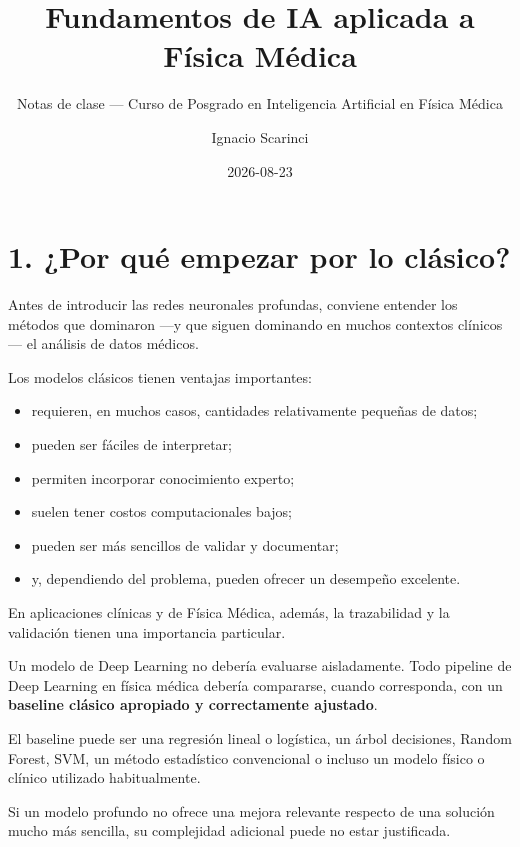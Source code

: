 \documentclass[
  letterpaper,
  DIV=11,
  numbers=noendperiod]{scrartcl}
\title{Fundamentos de IA aplicada a Física Médica}
\subtitle{Notas de clase --- Curso de Posgrado en Inteligencia
Artificial en Física Médica}
\author{Ignacio Scarinci}
\date{2026-08-23}
\providecommand{\tightlist}{%
  \setlength{\itemsep}{0pt}\setlength{\parskip}{0pt}}
\begin{document}
\maketitle


\section{1. ¿Por qué empezar por lo
clásico?}\label{por-quuxe9-empezar-por-lo-cluxe1sico}

Antes de introducir las redes neuronales profundas, conviene entender
los métodos que dominaron ---y que siguen dominando en muchos contextos
clínicos--- el análisis de datos médicos.

Los modelos clásicos tienen ventajas importantes:

\begin{itemize}
\tightlist
\item
  requieren, en muchos casos, cantidades relativamente pequeñas de
  datos;
\item
  pueden ser fáciles de interpretar;
\item
  permiten incorporar conocimiento experto;
\item
  suelen tener costos computacionales bajos;
\item
  pueden ser más sencillos de validar y documentar;
\item
  y, dependiendo del problema, pueden ofrecer un desempeño excelente.
\end{itemize}

En aplicaciones clínicas y de Física Médica, además, la trazabilidad y
la validación tienen una importancia particular.

\begin{tcolorbox}[enhanced jigsaw, arc=.35mm, bottomrule=.15mm, bottomtitle=1mm, breakable, colback=white, colbacktitle=quarto-callout-important-color!10!white, colframe=quarto-callout-important-color-frame, coltitle=black, left=2mm, leftrule=.75mm, opacityback=0, opacitybacktitle=0.6, rightrule=.15mm, title=\textcolor{quarto-callout-important-color}{\faExclamation}\hspace{0.5em}{Regla de oro}, titlerule=0mm, toprule=.15mm, toptitle=1mm]

Un modelo de Deep Learning no debería evaluarse aisladamente. Todo
pipeline de Deep Learning en física médica debería compararse, cuando
corresponda, con un \textbf{baseline clásico apropiado y correctamente
ajustado}.

El baseline puede ser una regresión lineal o logística, un árbol
decisiones, Random Forest, SVM, un método estadístico convencional o
incluso un modelo físico o clínico utilizado habitualmente.

Si un modelo profundo no ofrece una mejora relevante respecto de una
solución mucho más sencilla, su complejidad adicional puede no estar
justificada.

\end{tcolorbox}
\end{document}
